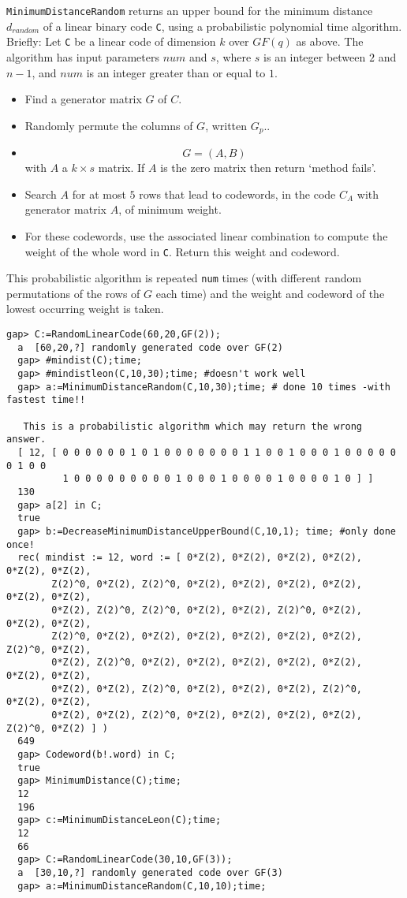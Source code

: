 \documentclass[11pt]{report}
\begin{document}
{{{ \texttt{MinimumDistanceRandom} returns an upper bound for the minimum distance $d_{random}$ of a linear binary code \mbox{\texttt{C}}, using a probabilistic polynomial time algorithm. Briefly: Let \mbox{\texttt{C}} be a linear code of dimension $k$ over $GF(q)$ as above. The algorithm has input parameters $num$ and $s$, where $s$ is an integer between $2$ and $n-1$, and $num$ is an integer greater than or equal to $1$. 
\begin{itemize}
\item  Find a generator matrix $G$ of $C$. 
\item  Randomly permute the columns of $G$, written $G_p$.. 
\item  
\[ G=(A, B) \]
 with $A$ a $k\times s$ matrix. If $A$ is the zero matrix then return `method fails'. 
\item  Search $A$ for at most $5$ rows that lead to codewords, in the code $C_A$ with generator matrix $A$, of minimum weight. 
\item  For these codewords, use the associated linear combination to compute the
weight of the whole word in \mbox{\texttt{C}}. Return this weight and codeword. 
\end{itemize}
 This probabilistic algorithm is repeated \mbox{\texttt{num}} times (with different random permutations of the rows of $G$ each time) and the weight and codeword of the lowest occurring weight is
taken. }

 
\begin{Verbatim}[fontsize=\small,frame=single,label=Example]
  gap> C:=RandomLinearCode(60,20,GF(2));
  a  [60,20,?] randomly generated code over GF(2)
  gap> #mindist(C);time;
  gap> #mindistleon(C,10,30);time; #doesn't work well
  gap> a:=MinimumDistanceRandom(C,10,30);time; # done 10 times -with fastest time!!
  
   This is a probabilistic algorithm which may return the wrong answer.
  [ 12, [ 0 0 0 0 0 0 1 0 1 0 0 0 0 0 0 0 1 1 0 0 1 0 0 0 1 0 0 0 0 0 0 1 0 0 
          1 0 0 0 0 0 0 0 0 0 1 0 0 0 1 0 0 0 0 1 0 0 0 0 1 0 ] ]
  130
  gap> a[2] in C;
  true
  gap> b:=DecreaseMinimumDistanceUpperBound(C,10,1); time; #only done once!
  rec( mindist := 12, word := [ 0*Z(2), 0*Z(2), 0*Z(2), 0*Z(2), 0*Z(2), 0*Z(2), 
        Z(2)^0, 0*Z(2), Z(2)^0, 0*Z(2), 0*Z(2), 0*Z(2), 0*Z(2), 0*Z(2), 0*Z(2), 
        0*Z(2), Z(2)^0, Z(2)^0, 0*Z(2), 0*Z(2), Z(2)^0, 0*Z(2), 0*Z(2), 0*Z(2), 
        Z(2)^0, 0*Z(2), 0*Z(2), 0*Z(2), 0*Z(2), 0*Z(2), 0*Z(2), Z(2)^0, 0*Z(2), 
        0*Z(2), Z(2)^0, 0*Z(2), 0*Z(2), 0*Z(2), 0*Z(2), 0*Z(2), 0*Z(2), 0*Z(2), 
        0*Z(2), 0*Z(2), Z(2)^0, 0*Z(2), 0*Z(2), 0*Z(2), Z(2)^0, 0*Z(2), 0*Z(2), 
        0*Z(2), 0*Z(2), Z(2)^0, 0*Z(2), 0*Z(2), 0*Z(2), 0*Z(2), Z(2)^0, 0*Z(2) ] )
  649
  gap> Codeword(b!.word) in C;
  true
  gap> MinimumDistance(C);time;
  12
  196
  gap> c:=MinimumDistanceLeon(C);time;
  12
  66
  gap> C:=RandomLinearCode(30,10,GF(3));
  a  [30,10,?] randomly generated code over GF(3)
  gap> a:=MinimumDistanceRandom(C,10,10);time;
  

\end{Verbatim}}}
\end{document}
